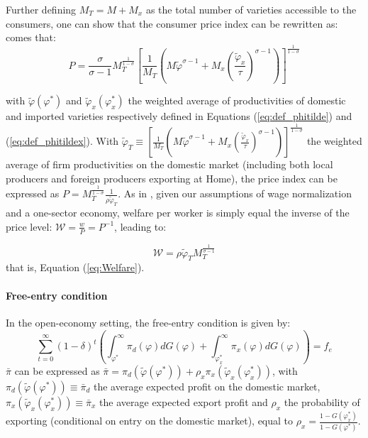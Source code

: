 \documentclass[a4paper,11pt]{article}
\begin{document}
Further defining $M_T = M+M_x$ as the total number of varieties accessible to the consumers, one can show that the consumer price index can be rewritten as: comes that:
$$P = \frac{\sigma}{\sigma-1}M_T^{\frac{1}{1-\sigma}}\left[\frac{1}{M_T}\left(M\widetilde{\varphi}^{\sigma-1} + M_x \left( \frac{\widetilde{\varphi}_x}{\tau} \right)^{\sigma-1} \right)  \right]^{\frac{1}{1-\sigma}}$$

\noindent with $\widetilde{\varphi}(\varphi^\ast)$ and $\widetilde{\varphi}_x(\varphi_x^\ast)$ the weighted average of productivities of domestic and imported varieties respectively defined in Equations (\ref{eq:def_phitilde}) and (\ref{eq:def_phitildex}). With $\widetilde{\varphi}_T \equiv \left[\frac{1}{M_T}\left(M\widetilde{\varphi}^{\sigma-1} + M_x \left( \frac{\widetilde{\varphi}_x}{\tau} \right)^{\sigma-1} \right)  \right]^{\frac{1}{1-\sigma}}$ the weighted average of firm productivities on the domestic market (including both local producers and foreign producers exporting at Home), the price index can be expressed as $P = M_T^{\frac{1}{1-\sigma}}\frac{1}{\rho \widetilde{\varphi}_T }$. As in \cite{melitz}, given our assumptions of wage normalization and a one-sector economy, welfare per worker is simply equal the inverse of the price level: $\mathcal{W} = \frac{w}{P}= P^{-1}$, leading to:

\begin{equation*}
\mathcal{W} = \rho \widetilde{\varphi}_T M_T^{\frac{1}{\sigma-1}}
\end{equation*}
\noindent that is, Equation (\ref{eq:Welfare}).

\paragraph{Free-entry condition} In the open-economy setting, the free-entry condition is given by:
\begin{equation*}
  \sum_{t=0}^{\infty}(1-\delta)^t \left(\int_{\varphi^\ast}^{\infty} \pi_d(\varphi )dG(\varphi) + \int_{\varphi_x^\ast}^{\infty} \pi_x(\varphi )dG(\varphi)  \right) = f_e
\end{equation*}
$\bar{\pi}$ can be expressed as $\bar{\pi} =\pi_d(\widetilde{\varphi}(\varphi^\ast)) + \rho_x \pi_x(\widetilde{\varphi}_x(\varphi_x^\ast))$, with $\pi_d(\widetilde{\varphi}(\varphi^\ast)) \equiv \bar{\pi}_d$ the average expected profit on the domestic market, $\pi_x(\widetilde{\varphi}_x(\varphi_x^\ast))\equiv \bar{\pi}_x$ the average expected export profit and $\rho_x$ the probability of exporting (conditional on entry on the domestic market), equal to $\rho_x = \frac{1-G(\varphi_x^\ast)}{1-G(\varphi^\ast)}$.
\end{document}

